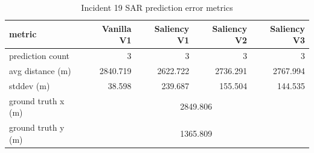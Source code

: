 \begin{table}[ht]
\centering
\caption{Incident 19 SAR prediction error metrics}
\label{tab:sar-incident-19}
\begin{tabular}{lrrrr}
\hline
metric & Vanilla V1 & Saliency V1 & Saliency V2 & Saliency V3 \\
\hline
prediction count & 3 & 3 & 3 & 3 \\
avg distance (m) & 2840.719 & 2622.722 & 2736.291 & 2767.994 \\
stddev (m) & 38.598 & 239.687 & 155.504 & 144.535 \\
ground truth x (m) & \multicolumn{4}{c}{2849.806} \\
ground truth y (m) & \multicolumn{4}{c}{1365.809} \\
\hline
\end{tabular}
\end{table}
